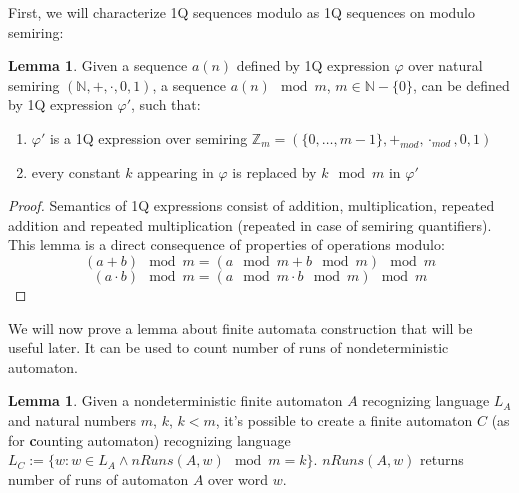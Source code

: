 \documentclass[12pt]{article}
\theoremstyle{definition}
\newtheorem{lemma}[theorem]{Lemma}
\begin{document}
First, we will characterize 1Q sequences modulo as 1Q sequences on modulo semiring:

\begin{lemma}
    \label{1QModulo}
    Given a sequence $a(n)$ defined by 1Q expression $\varphi$ over natural semiring $(\mathbb{N}, +, \cdot, 0, 1)$, a sequence $a(n) \mod m$, $m \in \mathbb{N} - \{0\}$, can be defined by 1Q expression $\varphi'$, such that:
    \begin{enumerate}
        \item $\varphi'$ is a 1Q expression over semiring $\mathbb{Z}_m = (\{0,\ldots,m-1\}, +_{mod}, \cdot_{mod}, 0, 1)$
        \item every constant $k$ appearing in $\varphi$ is replaced by $k \mod m$ in $\varphi'$
    \end{enumerate}
\end{lemma}

\begin{proof}
    Semantics of 1Q expressions consist of addition, multiplication, repeated addition and repeated multiplication (repeated in case of semiring quantifiers). This lemma is a direct consequence of properties of operations modulo:
    $$(a + b) \mod m = (a \mod m + b \mod m) \mod m$$
    $$(a \cdot b) \mod m = (a \mod m \cdot b \mod m) \mod m$$
\end{proof}

We will now prove a lemma about finite automata construction that will be useful later. It can be used to count number of runs of nondeterministic automaton.

\begin{lemma}
    \label{CountRunsAutomaton}
    Given a nondeterministic finite automaton $A$ recognizing language $L_A$ and natural numbers $m$, $k$, $k < m$, it's possible to create a finite automaton $C$ (as for \textbf{c}ounting automaton) recognizing language $L_{C} := \{ w : w \in L_A \land nRuns(A, w) \mod m = k \}$. $nRuns(A, w)$ returns number of runs of automaton $A$ over word $w$.
\end{lemma}
\end{document}
